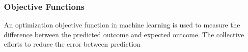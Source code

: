 \subsubsection{Objective Functions}
An optimization objective function in machine learning is used to measure the difference between the predicted outcome and expected outcome. The collective efforts to reduce the error between prediction 